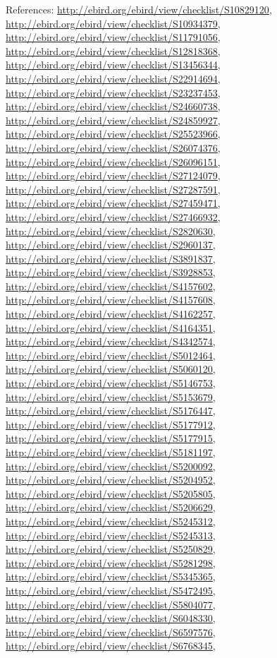 \documentclass[9pt, article]{memoir}
\begin{document}
\begin{multicols}{2}
References: 
\url{http://ebird.org/ebird/view/checklist/S10829120}, 
\url{http://ebird.org/ebird/view/checklist/S10934379}, 
\url{http://ebird.org/ebird/view/checklist/S11791056}, 
\url{http://ebird.org/ebird/view/checklist/S12818368}, 
\url{http://ebird.org/ebird/view/checklist/S13456344}, 
\url{http://ebird.org/ebird/view/checklist/S22914694}, 
\url{http://ebird.org/ebird/view/checklist/S23237453}, 
\url{http://ebird.org/ebird/view/checklist/S24660738}, 
\url{http://ebird.org/ebird/view/checklist/S24859927}, 
\url{http://ebird.org/ebird/view/checklist/S25523966}, 
\url{http://ebird.org/ebird/view/checklist/S26074376}, 
\url{http://ebird.org/ebird/view/checklist/S26096151}, 
\url{http://ebird.org/ebird/view/checklist/S27124079}, 
\url{http://ebird.org/ebird/view/checklist/S27287591}, 
\url{http://ebird.org/ebird/view/checklist/S27459471}, 
\url{http://ebird.org/ebird/view/checklist/S27466932}, 
\url{http://ebird.org/ebird/view/checklist/S2820630}, 
\url{http://ebird.org/ebird/view/checklist/S2960137}, 
\url{http://ebird.org/ebird/view/checklist/S3891837}, 
\url{http://ebird.org/ebird/view/checklist/S3928853}, 
\url{http://ebird.org/ebird/view/checklist/S4157602}, 
\url{http://ebird.org/ebird/view/checklist/S4157608}, 
\url{http://ebird.org/ebird/view/checklist/S4162257}, 
\url{http://ebird.org/ebird/view/checklist/S4164351}, 
\url{http://ebird.org/ebird/view/checklist/S4342574}, 
\url{http://ebird.org/ebird/view/checklist/S5012464}, 
\url{http://ebird.org/ebird/view/checklist/S5060120}, 
\url{http://ebird.org/ebird/view/checklist/S5146753}, 
\url{http://ebird.org/ebird/view/checklist/S5153679}, 
\url{http://ebird.org/ebird/view/checklist/S5176447}, 
\url{http://ebird.org/ebird/view/checklist/S5177912}, 
\url{http://ebird.org/ebird/view/checklist/S5177915}, 
\url{http://ebird.org/ebird/view/checklist/S5181197}, 
\url{http://ebird.org/ebird/view/checklist/S5200092}, 
\url{http://ebird.org/ebird/view/checklist/S5204952}, 
\url{http://ebird.org/ebird/view/checklist/S5205805}, 
\url{http://ebird.org/ebird/view/checklist/S5206629}, 
\url{http://ebird.org/ebird/view/checklist/S5245312}, 
\url{http://ebird.org/ebird/view/checklist/S5245313}, 
\url{http://ebird.org/ebird/view/checklist/S5250829}, 
\url{http://ebird.org/ebird/view/checklist/S5281298}, 
\url{http://ebird.org/ebird/view/checklist/S5345365}, 
\url{http://ebird.org/ebird/view/checklist/S5472495}, 
\url{http://ebird.org/ebird/view/checklist/S5804077}, 
\url{http://ebird.org/ebird/view/checklist/S6048330}, 
\url{http://ebird.org/ebird/view/checklist/S6597576}, 
\url{http://ebird.org/ebird/view/checklist/S6768345}, 

\end{multicols}
\end{document}
